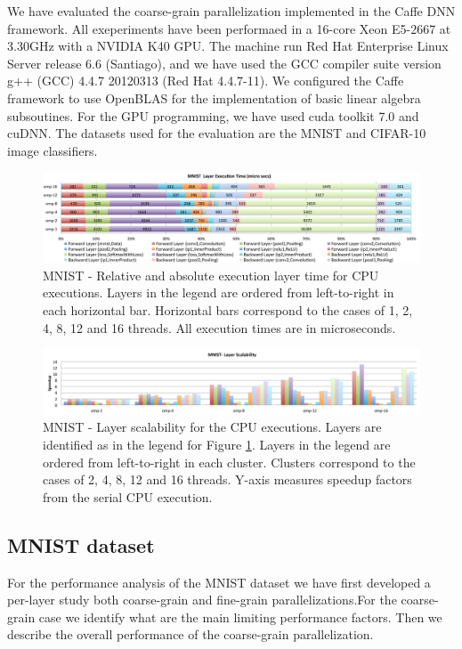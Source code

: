 We have evaluated the coarse-grain parallelization implemented in 
the Caffe DNN framework. All exeperiments have been performaed 
in a 16-core Xeon E5-2667 at 3.30GHz with a NVIDIA K40 GPU. 
The machine run Red Hat Enterprise Linux Server release 6.6 (Santiago), 
and we have used the GCC compiler suite version g++ (GCC) 4.4.7 20120313 
(Red Hat 4.4.7-11). We configured the Caffe framework to use OpenBLAS 
for the implementation of basic linear algebra subsoutines. 
For the GPU programming, we have used cuda toolkit 7.0 and cuDNN. 
The datasets used for the evaluation are the MNIST and CIFAR-10 
image classifiers.


\begin{figure}[]
\includegraphics[width=\linewidth]{figures/mnist-rel-abs-time.pdf}
\caption{MNIST - Relative and absolute execution layer time for CPU executions. Layers in the legend are ordered from left-to-right in each horizontal bar. Horizontal bars correspond to the cases of 1, 2, 4, 8, 12 and 16 threads. All execution times are in microseconds.}
\label{fig-mnist-abs-rel}
\end{figure}

\begin{figure}[]
\includegraphics[width=\textwidth]{figures/mnist-scalability-layer.pdf}
\caption{MNIST - Layer scalability for the CPU executions. Layers are identified as in the legend for Figure \ref{fig-mnist-abs-rel}. Layers in the legend are ordered from left-to-right in each cluster. Clusters correspond to the cases of 2, 4, 8, 12 and 16 threads. Y-axis measures speedup factors from the serial CPU execution.}
\label{fig-mnist-scalability}
\end{figure}

\subsection{MNIST dataset}
For the performance analysis of the MNIST dataset we have first 
developed a per-layer study both coarse-grain and fine-grain parallelizations.For the coarse-grain case we identify what are the main limiting 
performance factors. Then we describe the overall performance of the 
coarse-grain parallelization. 

